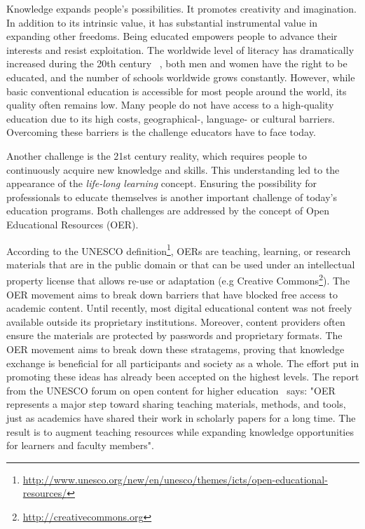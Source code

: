 \documentclass[ngerman,UKenglish,table]{scrbook}
\begin{document}
Knowledge expands people’s possibilities.
It promotes creativity and imagination.
In addition to its intrinsic value, it has substantial instrumental value in expanding other freedoms.
Being educated empowers people to advance their interests and resist exploitation.
The worldwide level of literacy has dramatically increased during the 20th century ~\cite{klugman2010human},
both men and women have the right to be educated, and the number of schools worldwide grows constantly.
However, while basic conventional education is accessible for most people around the world, its quality often remains low.
Many people do not have access to a high-quality education due to its high costs, geographical-, language- or cultural barriers.
Overcoming these barriers is the challenge educators have to face today.

Another challenge is the 21st century reality, which requires people to continuously acquire new knowledge and skills.
This understanding led to the appearance of the \emph{life-long learning} concept.
Ensuring the possibility for professionals to educate themselves is another important challenge of today's education programs.
Both challenges are addressed by the concept of Open Educational Resources (OER).
 
According to the UNESCO definition\footnote{\url{http://www.unesco.org/new/en/unesco/themes/icts/open-educational-resources/}}, OERs are teaching, learning, or research materials that are in the public domain or that can be used under an intellectual property license that allows re-use or adaptation (e.g Creative Commons\footnote{\url{http://creativecommons.org}}).
The OER movement aims to break down barriers that have blocked free access to academic content.
Until recently, most digital educational content was not freely available outside its proprietary institutions.
Moreover, content providers often ensure the materials are protected by passwords and proprietary formats.
The OER movement aims to break down these stratagems, proving that knowledge exchange is beneficial for all participants and society as a whole.
The effort put in promoting these ideas has already been accepted on the highest levels. 
The report from the UNESCO forum on open content for higher education~\cite{unesco} says: "OER represents a major step toward sharing teaching materials, methods, and tools, just as academics have shared their work in scholarly papers for a long time.
The result is to augment teaching resources while expanding knowledge opportunities for learners and faculty members". 
\end{document}
